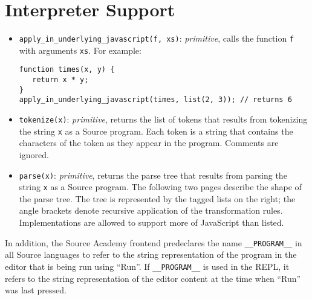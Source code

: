 \section*{Interpreter Support}

\begin{itemize}
\item \lstinline{apply_in_underlying_javascript(f, xs)}: \textit{primitive}, calls the function \lstinline{f}
with arguments \lstinline{xs}. For example:
\begin{lstlisting}
function times(x, y) {
   return x * y;
}
apply_in_underlying_javascript(times, list(2, 3)); // returns 6
\end{lstlisting}
\item \lstinline{tokenize(x)}: \textit{primitive}, returns the list of tokens that results from tokenizing
  the string \lstinline{x} as a Source program. Each token is a string that contains the characters of
  the token as they appear in the program. Comments are ignored.
\item \lstinline{parse(x)}: \textit{primitive}, returns the parse tree that results from parsing
  the string \lstinline{x} as a Source program. The following two pages describe the shape of the parse tree.
  The tree is represented by the tagged lists on the right; the angle brackets denote recursive application
  of the transformation rules. Implementations are allowed to support more of JavaScript than listed.
\end{itemize}
In addition, the Source Academy frontend predeclares the name \lstinline{__PROGRAM__} in all Source languages
to refer to the string representation of the program in the editor that is being run using ``Run''.
If \lstinline{__PROGRAM__} is used in the REPL, it refers to the string representation of the editor content
at the time when ``Run'' was last pressed.

\newpage
{}
\recalctypearea
	\addtolength{\oddsidemargin}{-5cm}
	\addtolength{\evensidemargin}{-5cm}
	\addtolength{\textwidth}{13cm}

